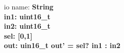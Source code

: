 \documentclass[preview]{standalone}
\begin{document}
\begin{schema}{io}
  name: \bf{String} \\
  in1: \bf{uint16\_t} \\
  in2: \bf{uint16\_t} \\
  sel: [0,1] \\
  out: \bf{uin16\_t}
\ST
  out' = sel? in1 : in2
\end{schema}
\end{document}
